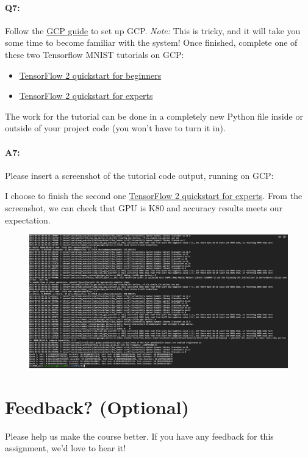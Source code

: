 
\pagebreak
\paragraph{Q7:} Follow the \href{https://browncsci1430.github.io/webpage/resources/gcp_guide/}{GCP guide} to set up GCP. \emph{Note:} This is tricky, and it will take you some time to become familiar with the system! Once finished, complete one of these two Tensorflow MNIST tutorials on GCP:
\begin{itemize}
    \item \href{https://www.tensorflow.org/tutorials/quickstart/beginner}{TensorFlow 2 quickstart for beginners}
    \item \href{https://www.tensorflow.org/tutorials/quickstart/advanced}{TensorFlow 2 quickstart for experts}
\end{itemize}

The work for the tutorial can be done in a completely new Python file inside or outside of your project code (you won't have to turn it in).


\paragraph{A7:} Please insert a screenshot of the tutorial code output, running on GCP:

I choose to finish the second one \href{https://www.tensorflow.org/tutorials/quickstart/advanced}{TensorFlow 2 quickstart for experts}. From the screenshot, we can check that GPU is K80 and accuracy results meets our expectation.
\begin{figure}[htbp]
    \includegraphics[width=\linewidth]{Q7.png}
\end{figure}




\pagebreak
\section*{Feedback? (Optional)}
Please help us make the course better. If you have any feedback for this assignment, we'd love to hear it!





